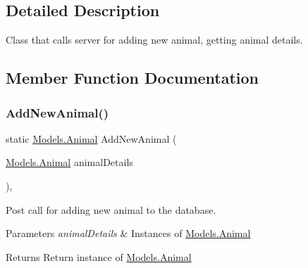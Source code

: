 \subsection{Detailed Description}
Class that calls server for adding new animal, getting animal details. 



\subsection{Member Function Documentation}
\mbox{\label{classWildlifeTrackingApp_1_1Delegates_1_1AnimalDelegate_a57a5b0f9728b68e90dd1aa38ebd9df14}} 
\subsubsection{\texorpdfstring{Add\+New\+Animal()}{AddNewAnimal()}}
{\footnotesize\ttfamily static \hyperlink{classWildlifeTrackingApp_1_1Models_1_1Animal}{Models.\+Animal} Add\+New\+Animal (\begin{DoxyParamCaption}\item[{\hyperlink{classWildlifeTrackingApp_1_1Models_1_1Animal}{Models.\+Animal}}]{animal\+Details }\end{DoxyParamCaption})\hspace{0.3cm}{\ttfamily [inline]}, {\ttfamily [static]}}



Post call for adding new animal to the database. 


\begin{DoxyParams}{Parameters}
{\em animal\+Details} & Instances of \hyperlink{classWildlifeTrackingApp_1_1Models_1_1Animal}{Models.\+Animal}\\
\hline
\end{DoxyParams}
\begin{DoxyReturn}{Returns}
Return instance of \hyperlink{classWildlifeTrackingApp_1_1Models_1_1Animal}{Models.\+Animal}
\end{DoxyReturn}
\mbox{\label{classWildlifeTrackingApp_1_1Delegates_1_1AnimalDelegate_a9261f08d6ea296a3ea3b63256c299770}} 
